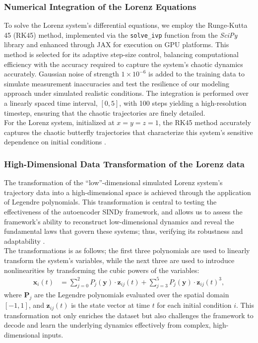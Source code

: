 \subsubsection{Numerical Integration of the Lorenz Equations}
To solve the Lorenz system's differential equations, we employ the Runge-Kutta 45 (RK45) method, implemented via the \texttt{solve\_ivp} function from the \textit{SciPy} library and enhanced through JAX for execution on GPU platforms. This method is selected for its adaptive step-size control, balancing computational efficiency with the accuracy required to capture the system's chaotic dynamics accurately. Gaussian noise of strength \(1 \times 10^{-6}\) is added to the training data to simulate measurement inaccuracies and test the resilience of our modeling approach under simulated realistic conditions. The integration is performed over a linearly spaced time interval, \([0,5]\), with 100 steps yielding a high-resolution timestep, ensuring that the chaotic trajectories are finely detailed.\\

For the Lorenz system, initialized at \(x=y=z=1\), the RK45 method accurately captures the chaotic butterfly trajectories that characterize this system's sensitive dependence on initial conditions \cite{lorenz1963deterministic}.

\subsubsection{High-Dimensional Data Transformation of the Lorenz data}

The transformation of the ``low''-dimensional simulated Lorenz system's trajectory data into a high-dimensional space is achieved through the application of Legendre polynomials.
This transformation is central to testing the effectiveness of the autoencoder SINDy framework, and allows us to assess the framework's ability to reconstruct low-dimensional dynamics and reveal the fundamental laws that govern these systems; thus, verifying its robustness and adaptability \cite{Champion_2019}.\\

The transformations is as follows; the first three polynomials are used to linearly transform the system's variables, while the next three are used to introduce nonlinearities by transforming the cubic powers of the variables:
\begin{equation}
\begin{aligned}
    \mathbf{x}_i(t) &= \sum_{j=0}^{2} P_j(\mathbf{y}) \cdot \mathbf{z}_{ij}(t) + \sum_{j=3}^{5} P_j(\mathbf{y}) \cdot \mathbf{z}_{ij}(t)^3,
\end{aligned}
\end{equation}
where \( \mathbf{P}_j \) are the Legendre polynomials evaluated over the spatial domain \([-1, 1]\), and \( \mathbf{z}_{ij}(t) \) is the state vector at time \( t \) for each initial condition \( i \). This transformation not only enriches the dataset but also challenges the framework to decode and learn the underlying dynamics effectively from complex, high-dimensional inputs.

